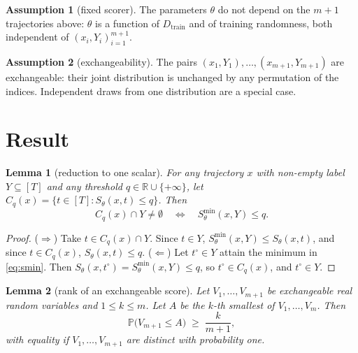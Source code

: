 \documentclass[10pt,a4paper]{article}
\newtheorem{lemma}{Lemma}
\theoremstyle{definition}
\newtheorem{assumption}{Assumption}
\theoremstyle{remark}
\newcommand{\Prob}{\mathbb{P}}
\newcommand{\R}{\mathbb{R}}
\newcommand{\C}{C}
\newcommand{\Smin}{S^{\min}}
\newcommand{\Dtr}{D_{\mathrm{train}}}
\begin{document}
\begin{assumption}[fixed scorer] \label{as:fixed}
The parameters $\theta$ do not depend on the $m+1$ trajectories above: $\theta$ is a function of $\Dtr$ and of training randomness, both independent of $(x_i,Y_i)_{i=1}^{m+1}$.
\end{assumption}

\begin{assumption}[exchangeability] \label{as:exch}
The pairs $(x_1,Y_1),\dots,(x_{m+1},Y_{m+1})$ are exchangeable: their joint distribution is unchanged by any permutation of the indices. Independent draws from one distribution are a special case.
\end{assumption}

\section{Result}

\begin{lemma}[reduction to one scalar] \label{lem:reduction}
For any trajectory $x$ with non-empty label $Y\subseteq[T]$ and any threshold $q\in\R\cup\{+\infty\}$, let $\C_q(x)=\{t\in[T]:S_\theta(x,t)\le q\}$. Then
\[
\C_q(x)\cap Y\neq\emptyset\quad\Longleftrightarrow\quad\Smin_\theta(x,Y)\le q .
\]
\end{lemma}

\begin{proof}
($\Rightarrow$) Take $t\in\C_q(x)\cap Y$. Since $t\in Y$, $\Smin_\theta(x,Y)\le S_\theta(x,t)$, and since $t\in\C_q(x)$, $S_\theta(x,t)\le q$.
($\Leftarrow$) Let $t^\circ\in Y$ attain the minimum in \eqref{eq:smin}. Then $S_\theta(x,t^\circ)=\Smin_\theta(x,Y)\le q$, so $t^\circ\in\C_q(x)$, and $t^\circ\in Y$.
\end{proof}

\begin{lemma}[rank of an exchangeable score] \label{lem:rank}
Let $V_1,\dots,V_{m+1}$ be exchangeable real random variables and $1\le k\le m$. Let $A$ be the $k$-th smallest of $V_1,\dots,V_m$. Then
\[
\Prob\big(V_{m+1}\le A\big)\;\ge\;\frac{k}{m+1},
\]
with equality if $V_1,\dots,V_{m+1}$ are distinct with probability one.
\end{lemma}
\end{document}
